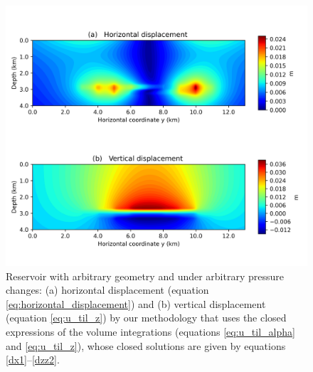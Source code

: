 \documentclass[P]{BrJG_submit}
\begin{document}
\begin{figure}[t]
    \centering
    \includegraphics[scale=0.40]{figures/Figure_Displacement_complex_reservoir.png}
    \vspace{-0.5cm}
    \caption{Reservoir with arbitrary geometry and under arbitrary pressure changes: 
    (a) horizontal displacement (equation \ref{eq:horizontal_displacement}) and (b) vertical displacement 
    (equation \ref{eq:u_til_z}) by our methodology that uses the closed expressions of the volume integrations 
	(equations \ref{eq:u_til_alpha} and \ref{eq:u_til_z}), whose closed solutions are given by equations 
	\ref{dx1}--\ref{dzz2}.}
	\label{fig:displacement_complex_reservoir}
\end{figure}


\end{document}
